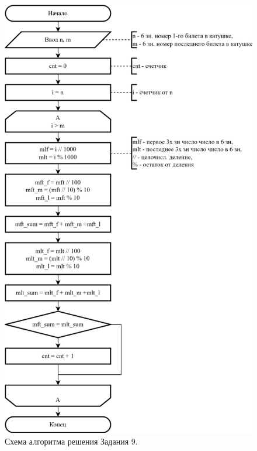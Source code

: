 \documentclass[oneside,a4paper,14pt]{extarticle}
\begin{document}
\begin{figure}
	\centering
	\includegraphics[height=0.9\textheight]{img/9-scheme.png} %
	\caption{Схема алгоритма решения Задания 9.} %
\end{figure}
\end{document}

